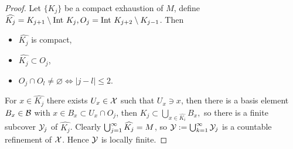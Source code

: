 \begin{proof}
    Let $\{K_j\}$ be a compact exhaustion of $M$, define 
    $\widehat{K_j} = K_{j+1} \setminus \mathrm{Int~} K_j, O_j = \mathrm{Int~} K_{j+2} \setminus K_{j-1}$. Then
    \begin{itemize}
        \item $\hat{K_j}$ is compact,
        \item $\hat{K_j} \subset O_j$, 
        \item $O_j \cap O_l \neq \varnothing \iff |j-l| \leq 2$. 
    \end{itemize}
    For $x \in \hat{K_j}$ there exists $U_x \in \mathcal{X}$ such that $U_x \ni x$, 
    then there is a basis element $B_x \in \mathcal{B}$ with 
    $x \in B_x \subset U_x \cap O_j$, then $\hat{K_j} \subset \bigcup_{x \in \hat{K_i}} B_x, $
    so there is a finite subcover $\mathcal{Y}_j$ of $\hat{K_j}$. 
    Clearly $\bigcup_{j=1}^{\infty}\widehat{K_j} = M$, so $\mathcal{Y} := \bigcup_{k=1}^{\infty}\mathcal{Y}_j$ is a countable refinement of $\mathcal{X}$. Hence $\mathcal{Y}$ is locally finite. 
\end{proof}

